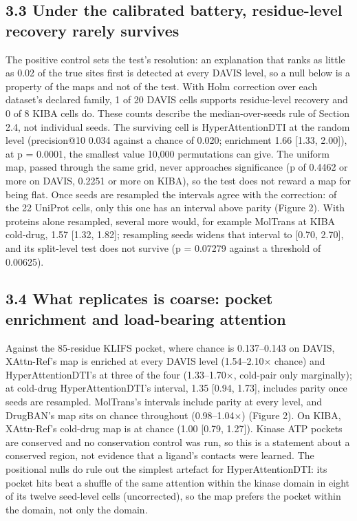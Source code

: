 \subsection{3.3 Under the calibrated battery, residue-level recovery rarely survives}\label{under-the-calibrated-battery-residue-level-recovery-rarely-survives}

The positive control sets the test's resolution: an explanation that ranks as little as 0.02 of the true sites first is detected at every DAVIS level, so a null below is a property of the maps and not of the test. With Holm correction over each dataset's declared family, 1 of 20 DAVIS cells supports residue-level recovery and 0 of 8 KIBA cells do. These counts describe the median-over-seeds rule of Section 2.4, not individual seeds. The surviving cell is HyperAttentionDTI at the random level (precision@10 0.034 against a chance of 0.020; enrichment 1.66 {[}1.33, 2.00{]}), at p = 0.0001, the smallest value 10,000 permutations can give. The uniform map, passed through the same grid, never approaches significance (p of 0.4462 or more on DAVIS, 0.2251 or more on KIBA), so the test does not reward a map for being flat. Once seeds are resampled the intervals agree with the correction: of the 22 UniProt cells, only this one has an interval above parity (Figure 2). With proteins alone resampled, several more would, for example MolTrans at KIBA cold-drug, 1.57 {[}1.32, 1.82{]}; resampling seeds widens that interval to {[}0.70, 2.70{]}, and its split-level test does not survive (p = 0.07279 against a threshold of 0.00625).

\subsection{3.4 What replicates is coarse: pocket enrichment and load-bearing attention}\label{what-replicates-is-coarse-pocket-enrichment-and-load-bearing-attention}

Against the 85-residue KLIFS pocket, where chance is 0.137--0.143 on DAVIS, XAttn-Ref's map is enriched at every DAVIS level (1.54--2.10$\times$ chance) and HyperAttentionDTI's at three of the four (1.33--1.70$\times$, cold-pair only marginally); at cold-drug HyperAttentionDTI's interval, 1.35 {[}0.94, 1.73{]}, includes parity once seeds are resampled. MolTrans's intervals include parity at every level, and DrugBAN's map sits on chance throughout (0.98--1.04$\times$) (Figure 2). On KIBA, XAttn-Ref's cold-drug map is at chance (1.00 {[}0.79, 1.27{]}). Kinase ATP pockets are conserved and no conservation control was run, so this is a statement about a conserved region, not evidence that a ligand's contacts were learned. The positional nulls do rule out the simplest artefact for HyperAttentionDTI: its pocket hits beat a shuffle of the same attention within the kinase domain in eight of its twelve seed-level cells (uncorrected), so the map prefers the pocket within the domain, not only the domain.

